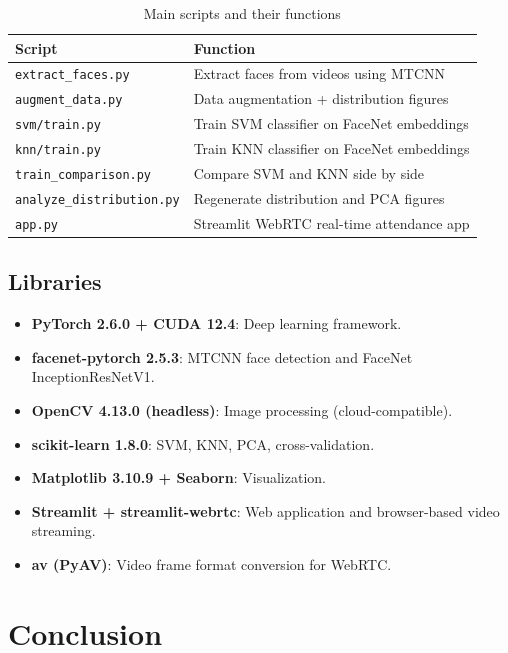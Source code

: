 \documentclass[12pt,a4paper]{article}
\begin{document}
\begin{table}[H]
    \centering
    \caption{Main scripts and their functions}
    \label{tab:scripts}
    \begin{tabular}{l l}
        \toprule
        \textbf{Script} & \textbf{Function} \\
        \midrule
        \texttt{extract\_faces.py} & Extract faces from videos using MTCNN \\
        \texttt{augment\_data.py}  & Data augmentation + distribution figures \\
        \texttt{svm/train.py}      & Train SVM classifier on FaceNet embeddings \\
        \texttt{knn/train.py}      & Train KNN classifier on FaceNet embeddings \\
        \texttt{train\_comparison.py} & Compare SVM and KNN side by side \\
        \texttt{analyze\_distribution.py} & Regenerate distribution and PCA figures \\
        \texttt{app.py}           & Streamlit WebRTC real-time attendance app \\
        \bottomrule
    \end{tabular}
\end{table}

\subsection{Libraries}
\label{subsec:libraries}

\begin{itemize}
    \item \textbf{PyTorch 2.6.0 + CUDA 12.4}: Deep learning framework.
    \item \textbf{facenet-pytorch 2.5.3}: MTCNN face detection and FaceNet InceptionResNetV1.
    \item \textbf{OpenCV 4.13.0 (headless)}: Image processing (cloud-compatible).
    \item \textbf{scikit-learn 1.8.0}: SVM, KNN, PCA, cross-validation.
    \item \textbf{Matplotlib 3.10.9 + Seaborn}: Visualization.
    \item \textbf{Streamlit + streamlit-webrtc}: Web application and browser-based video streaming.
    \item \textbf{av (PyAV)}: Video frame format conversion for WebRTC.
\end{itemize}

\section{Conclusion}
\label{sec:conclusion}
\end{document}

